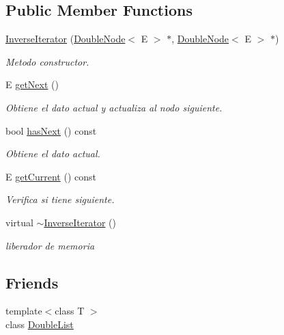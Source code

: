\subsection*{Public Member Functions}
\begin{DoxyCompactItemize}
\item 
\hyperlink{class_inverse_iterator_a31703976cbdca73a1035f47509e8229d}{Inverse\-Iterator} (\hyperlink{class_double_node}{Double\-Node}$<$ E $>$ $\ast$, \hyperlink{class_double_node}{Double\-Node}$<$ E $>$ $\ast$)
\begin{DoxyCompactList}\small\item\em Metodo constructor. \end{DoxyCompactList}\item 
E \hyperlink{class_inverse_iterator_a4c1d8ceb8264f7f8186b6244a0a62940}{get\-Next} ()
\begin{DoxyCompactList}\small\item\em Obtiene el dato actual y actualiza al nodo siguiente. \end{DoxyCompactList}\item 
bool \hyperlink{class_inverse_iterator_a86973781dfa84df67be2843fc4545692}{has\-Next} () const 
\begin{DoxyCompactList}\small\item\em Obtiene el dato actual. \end{DoxyCompactList}\item 
E \hyperlink{class_inverse_iterator_afdbb5c310621c773da10dfb5bc3b1a4c}{get\-Current} () const 
\begin{DoxyCompactList}\small\item\em Verifica si tiene siguiente. \end{DoxyCompactList}\item 
virtual \hyperlink{class_inverse_iterator_ae3b6736187c1dbc82ead0277d31e5898}{$\sim$\-Inverse\-Iterator} ()
\begin{DoxyCompactList}\small\item\em liberador de memoria \end{DoxyCompactList}\end{DoxyCompactItemize}
\subsection*{Friends}
\begin{DoxyCompactItemize}
\item 
{\footnotesize template$<$class T $>$ }\\class \hyperlink{class_inverse_iterator_ad435a9844a002995926acf522128f7a8}{Double\-List}
\end{DoxyCompactItemize}


